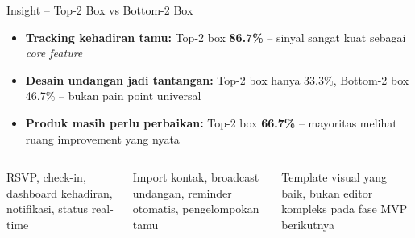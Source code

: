 \documentclass[aspectratio=169]{beamer}
\newcommand{\faChartBar}{[=]}
\newcommand{\faList}{[1]}
\newcommand{\faRobot}{[A]}
\newcommand{\faPalette}{[P]}
\begin{document}
\begin{frame}{Insight -- Top-2 Box vs Bottom-2 Box}
  \begin{tcolorbox}[insightbox,title={\faChartBar\quad Temuan Kunci}]
    \begin{itemize}\small
      \item \textbf{Tracking kehadiran tamu:} Top-2 box \textcolor{success}{\textbf{86.7\%}} -- sinyal sangat kuat sebagai \textit{core feature}
      \item \textbf{Desain undangan jadi tantangan:} Top-2 box hanya 33.3\%, Bottom-2 box \textcolor{danger}{46.7\%} -- bukan pain point universal
      \item \textbf{Produk masih perlu perbaikan:} Top-2 box \textbf{66.7\%} -- mayoritas melihat ruang improvement yang nyata
    \end{itemize}
  \end{tcolorbox}
  \vspace{0.3cm}
  \begin{columns}[T]
      \begin{tcolorbox}[statbox,title={\faList\quad 1. Core First},height=3.2cm]
        \tiny RSVP, check-in, dashboard kehadiran, notifikasi, status real-time
      \end{tcolorbox}
      \begin{tcolorbox}[statbox,title={\faRobot\quad 2. Automation},height=3.2cm]
        \tiny Import kontak, broadcast undangan, reminder otomatis, pengelompokan tamu
      \end{tcolorbox}
      \begin{tcolorbox}[statbox,title={\faPalette\quad 3. Design},height=3.2cm]
        \tiny Template visual yang baik, bukan editor kompleks pada fase MVP berikutnya
      \end{tcolorbox}
  \end{columns}
\end{frame}
\end{document}

